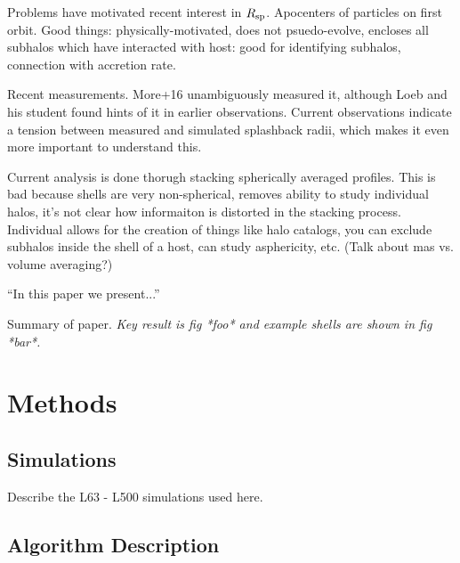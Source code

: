 \documentclass[numberedappendix,apj]{emulateapj}
\begin{document}
Problems have motivated recent interest in $R_{\rm sp}$. Apocenters of particles
on first orbit. Good things: physically-motivated, does not psuedo-evolve,
encloses all subhalos which have interacted with host: good for identifying
subhalos, connection with accretion rate.

Recent measurements. More+16 unambiguously measured it, although Loeb and his
student found hints of it in earlier observations. Current observations indicate
a tension between measured and simulated splashback radii, which makes it
even more important to understand this.

Current analysis is done thorugh stacking spherically averaged profiles. This
is bad because shells are very non-spherical, removes ability to study
individual halos, it's not clear how informaiton is distorted in the stacking
process. Individual allows for the creation of things like halo catalogs, you
can exclude subhalos inside the shell of a host, can study asphericity, etc.
(Talk about mas vs. volume averaging?)

``In this paper we present...''

Summary of paper. \emph{Key result is fig *foo* and example shells are shown in
fig *bar*.}

\section{Methods}
\label{sec:methods}

\subsection{Simulations}

Describe the L63 - L500 simulations used here.

\subsection{Algorithm Description}
\end{document}
